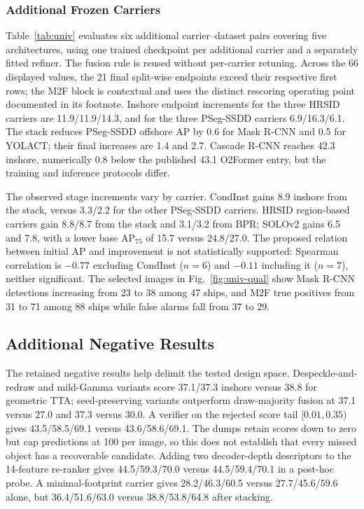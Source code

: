 \subsubsection{Additional Frozen Carriers}\label{sec:exp:carriers}
Table~\ref{tab:univ} evaluates six additional carrier--dataset pairs covering five architectures, using one trained checkpoint per additional carrier and a separately fitted refiner. The fusion rule is reused without per-carrier retuning. Across the 66 displayed values, the 21 final split-wise endpoints exceed their respective first rows; the M2F block is contextual and uses the distinct rescoring operating point documented in its footnote. Inshore endpoint increments for the three HRSID carriers are 11.9/11.9/14.3, and for the three PSeg-SSDD carriers 6.9/16.3/6.1. The stack reduces PSeg-SSDD offshore AP by 0.6 for Mask R-CNN and 0.5 for YOLACT; their final increases are 1.4 and 2.7. Cascade R-CNN reaches 42.3 inshore, numerically 0.8 below the published 43.1 O2Former entry, but the training and inference protocols differ.

The observed stage increments vary by carrier. CondInst gains 8.9 inshore from the stack, versus 3.3/2.2 for the other PSeg-SSDD carriers. HRSID region-based carriers gain 8.8/8.7 from the stack and 3.1/3.2 from BPR; SOLOv2 gains 6.5 and 7.8, with a lower base AP$_{75}$ of 15.7 versus 24.8/27.0. The proposed relation between initial AP and improvement is not statistically supported: Spearman correlation is $-0.77$ excluding CondInst ($n=6$) and $-0.11$ including it ($n=7$), neither significant. The selected images in Fig.~\ref{fig:univ-qual} show Mask R-CNN detections increasing from 23 to 38 among 47 ships, and M2F true positives from 31 to 71 among 88 ships while false alarms fall from 37 to 29.

\subsection{Additional Negative Results}\label{sec:exp:whatnot}
The retained negative results help delimit the tested design space. Despeckle-and-redraw and mild-Gamma variants score 37.1/37.3 inshore versus 38.8 for geometric TTA; seed-preserving variants outperform draw-majority fusion at 37.1 versus 27.0 and 37.3 versus 30.0. A verifier on the rejected score tail $[0.01,0.35)$ gives 43.5/58.5/69.1 versus 43.6/58.6/69.1. The dumps retain scores down to zero but cap predictions at 100 per image, so this does not establish that every missed object has a recoverable candidate. Adding two decoder-depth descriptors to the 14-feature re-ranker gives 44.5/59.3/70.0 versus 44.5/59.4/70.1 in a post-hoc probe. A minimal-footprint carrier gives 28.2/46.3/60.5 versus 27.7/45.6/59.6 alone, but 36.4/51.6/63.0 versus 38.8/53.8/64.8 after stacking.

